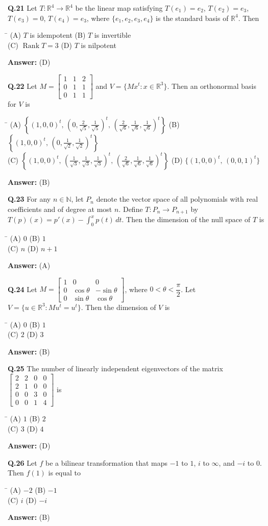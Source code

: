 \documentclass[11pt,a4paper]{article}
\newcommand{\optsfourA}[4]{%
  \begin{tabbing}
    \hspace{0.48\linewidth}\=\kill
    (A) #1 \> (B) #2 \\[2pt]
    (C) #3 \> (D) #4
  \end{tabbing}%
}
\newcommand{\ans}[1]{\textbf{Answer:} #1\par\medskip}
\begin{document}
\textbf{Q.21} Let $T : \mathbb{R}^4 \to \mathbb{R}^4$ be the linear map satisfying $T(e_1) = e_2$, $T(e_2) = e_3$, $T(e_3) = 0$, $T(e_4) = e_3$, where $\{e_1, e_2, e_3, e_4\}$ is the standard basis of $\mathbb{R}^4$. Then
\optsfourA{$T$ is idempotent}{$T$ is invertible}{$\operatorname{Rank} T = 3$}{$T$ is nilpotent}
\ans{(D)}

\textbf{Q.22} Let $M = \begin{bmatrix} 1 & 1 & 2 \\ 0 & 1 & 1 \\ 0 & 1 & 1 \end{bmatrix}$ and $V = \{M x^t : x \in \mathbb{R}^3\}$. Then an orthonormal basis for $V$ is
\optsfourA{$\left\{(1,0,0)^t,\, \left(0,\frac{2}{\sqrt{5}},\frac{1}{\sqrt{5}}\right)^t,\, \left(\frac{2}{\sqrt{6}},\frac{1}{\sqrt{6}},\frac{1}{\sqrt{6}}\right)^t\right\}$}{$\left\{(1,0,0)^t,\, \left(0,\frac{1}{\sqrt{2}},\frac{1}{\sqrt{2}}\right)^t\right\}$}{$\left\{(1,0,0)^t,\, \left(\frac{1}{\sqrt{3}},\frac{1}{\sqrt{3}},\frac{1}{\sqrt{3}}\right)^t,\, \left(\frac{2}{\sqrt{6}},\frac{1}{\sqrt{6}},\frac{1}{\sqrt{6}}\right)^t\right\}$}{$\{(1,0,0)^t,\, (0,0,1)^t\}$}
\ans{(B)}

\textbf{Q.23} For any $n \in \mathbb{N}$, let $P_n$ denote the vector space of all polynomials with real coefficients and of degree at most $n$. Define $T : P_n \to P_{n+1}$ by $T(p)(x) = p'(x) - \displaystyle\int_0^x p(t)\,dt$. Then the dimension of the null space of $T$ is
\optsfourA{$0$}{$1$}{$n$}{$n + 1$}
\ans{(A)}

\textbf{Q.24} Let $M = \begin{bmatrix} 1 & 0 & 0 \\ 0 & \cos\theta & -\sin\theta \\ 0 & \sin\theta & \cos\theta \end{bmatrix}$, where $0 < \theta < \dfrac{\pi}{2}$. Let $V = \{u \in \mathbb{R}^3 : M u^t = u^t\}$. Then the dimension of $V$ is
\optsfourA{$0$}{$1$}{$2$}{$3$}
\ans{(B)}

\textbf{Q.25} The number of linearly independent eigenvectors of the matrix $\begin{bmatrix} 2 & 2 & 0 & 0 \\ 2 & 1 & 0 & 0 \\ 0 & 0 & 3 & 0 \\ 0 & 0 & 1 & 4 \end{bmatrix}$ is
\optsfourA{$1$}{$2$}{$3$}{$4$}
\ans{(D)}

\textbf{Q.26} Let $f$ be a bilinear transformation that maps $-1$ to $1$, $i$ to $\infty$, and $-i$ to $0$. Then $f(1)$ is equal to
\optsfourA{$-2$}{$-1$}{$i$}{$-i$}
\ans{(B)}
\end{document}
